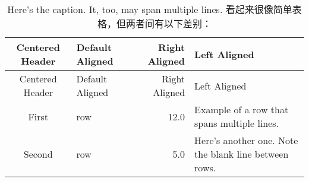 \documentclass[fancyhdr,bookmark]{ctexbook}
\begin{document}
\begin{longtable}[c]{@{}clrl@{}}
\caption{Here's the caption. It, too, may span multiple lines.
看起来很像简单表格，但两者间有以下差别：}\tabularnewline
\toprule
\begin{minipage}[b]{0.15\columnwidth}\centering\strut
Centered Header
\strut\end{minipage} &
\begin{minipage}[b]{0.10\columnwidth}\raggedright\strut
Default Aligned
\strut\end{minipage} &
\begin{minipage}[b]{0.20\columnwidth}\raggedleft\strut
Right Aligned
\strut\end{minipage} &
\begin{minipage}[b]{0.31\columnwidth}\raggedright\strut
Left Aligned
\strut\end{minipage}\tabularnewline
\midrule
\endfirsthead
\toprule
\begin{minipage}[b]{0.15\columnwidth}\centering\strut
Centered Header
\strut\end{minipage} &
\begin{minipage}[b]{0.10\columnwidth}\raggedright\strut
Default Aligned
\strut\end{minipage} &
\begin{minipage}[b]{0.20\columnwidth}\raggedleft\strut
Right Aligned
\strut\end{minipage} &
\begin{minipage}[b]{0.31\columnwidth}\raggedright\strut
Left Aligned
\strut\end{minipage}\tabularnewline
\midrule
\endhead
\begin{minipage}[t]{0.15\columnwidth}\centering\strut
First
\strut\end{minipage} &
\begin{minipage}[t]{0.10\columnwidth}\raggedright\strut
row
\strut\end{minipage} &
\begin{minipage}[t]{0.20\columnwidth}\raggedleft\strut
12.0
\strut\end{minipage} &
\begin{minipage}[t]{0.31\columnwidth}\raggedright\strut
Example of a row that spans multiple lines.
\strut\end{minipage}\tabularnewline
\begin{minipage}[t]{0.15\columnwidth}\centering\strut
Second
\strut\end{minipage} &
\begin{minipage}[t]{0.10\columnwidth}\raggedright\strut
row
\strut\end{minipage} &
\begin{minipage}[t]{0.20\columnwidth}\raggedleft\strut
5.0
\strut\end{minipage} &
\begin{minipage}[t]{0.31\columnwidth}\raggedright\strut
Here's another one. Note the blank line between rows.
\strut\end{minipage}\tabularnewline
\bottomrule
\end{longtable}
\end{document}
